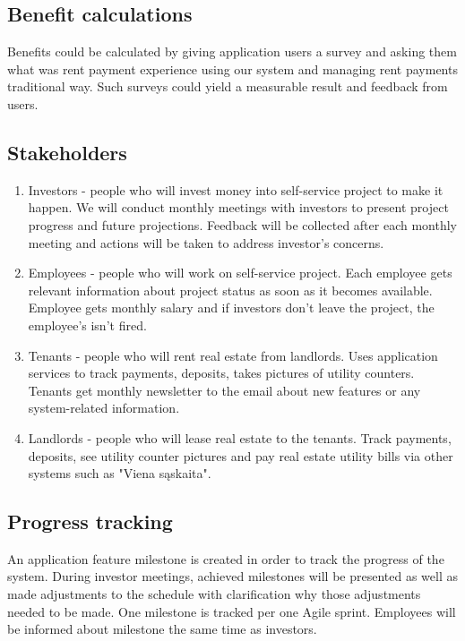 \documentclass{VUMIFPSkursinis}
\begin{document}
	\subsection{Benefit calculations}
		Benefits could be calculated by giving application users a survey and asking them what was rent payment experience using our system and managing rent payments traditional way.
		Such surveys could yield a measurable result and feedback from users.

	\subsection{Stakeholders}
		\begin{enumerate}
			\item{Investors - people who will invest money into self-service project to make it happen. 
				We will conduct monthly meetings with investors to present project progress and future projections.
				Feedback will be collected after each monthly meeting and actions will be taken to address investor's concerns.}
			\item{Employees - people who will work on self-service project.
				Each employee gets relevant information about project status as soon as it becomes available.
				Employee gets monthly salary and if investors don't leave the project, the employee's isn't fired.}
			\item{Tenants - people who will rent real estate from landlords.
					Uses application services to track payments, deposits, takes pictures of utility counters.
					Tenants get monthly newsletter to the email about new features or any system-related information.}
			\item{Landlords - people who will lease real estate to the tenants.
					Track payments, deposits, see utility counter pictures and pay real estate utility bills via other systems such as "Viena sąskaita".}
		\end{enumerate}

	\subsection{Progress tracking}
		An application feature milestone is created in order to track the progress of the system.
		During investor meetings, achieved milestones will be presented as well as made adjustments to the schedule with clarification why those adjustments needed to be made.
		One milestone is tracked per one Agile sprint.
		Employees will be informed about milestone the same time as investors.
\end{document}
